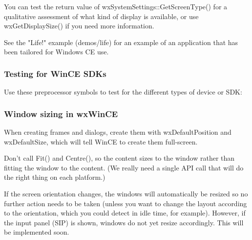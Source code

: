 You can test the return value of wxSystemSettings::GetScreenType()
for a qualitative assessment of what kind of display is available,
or use wxGetDisplaySize() if you need more information.

See the "Life!" example (demos/life) for an example of
an application that has been tailored for Windows CE use.

\subsubsection{Testing for WinCE SDKs}

Use these preprocessor symbols to test for the different types of device or SDK:

\begin{twocollist}\itemsep=0pt
\end{twocollist}

\subsubsection{Window sizing in wxWinCE}

When creating frames and dialogs, create them with wxDefaultPosition and
wxDefaultSize, which will tell WinCE to create them full-screen.

Don't call Fit() and Centre(), so the content sizes to
the window rather than fitting the window to the content. (We really need a single API call
that will do the right thing on each platform.)

If the screen orientation changes, the windows will automatically be resized
so no further action needs to be taken (unless you want to change the layout
according to the orientation, which you could detect in idle time, for example).
However, if the input panel (SIP) is shown, windows do not yet resize accordingly. This will
be implemented soon.

